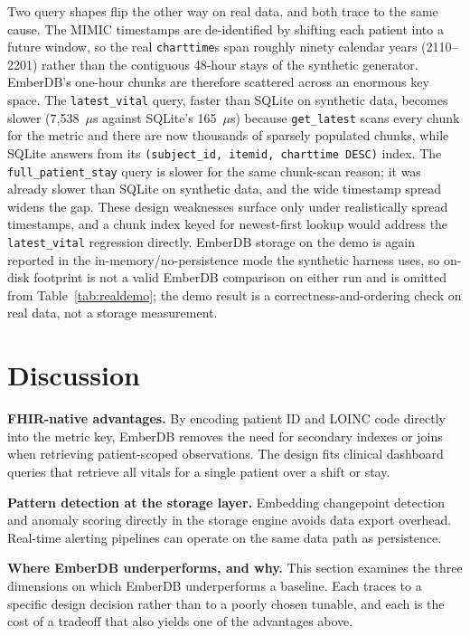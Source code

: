 \documentclass[journal]{IEEEtran}
\begin{document}
Two query shapes flip the other way on real data, and both trace to the same cause. The MIMIC timestamps are de-identified by shifting each patient into a future window, so the real \texttt{charttime}s span roughly ninety calendar years (2110--2201) rather than the contiguous 48-hour stays of the synthetic generator. EmberDB's one-hour chunks are therefore scattered across an enormous key space. The \texttt{latest\_vital} query, faster than SQLite on synthetic data, becomes slower (7{,}538~$\mu$s against SQLite's 165~$\mu$s) because \texttt{get\_latest} scans every chunk for the metric and there are now thousands of sparsely populated chunks, while SQLite answers from its \texttt{(subject\_id, itemid, charttime DESC)} index. The \texttt{full\_patient\_stay} query is slower for the same chunk-scan reason; it was already slower than SQLite on synthetic data, and the wide timestamp spread widens the gap. These design weaknesses surface only under realistically spread timestamps, and a chunk index keyed for newest-first lookup would address the \texttt{latest\_vital} regression directly. EmberDB storage on the demo is again reported in the in-memory/no-persistence mode the synthetic harness uses, so on-disk footprint is not a valid EmberDB comparison on either run and is omitted from Table~\ref{tab:realdemo}; the demo result is a correctness-and-ordering check on real data, not a storage measurement.

\section{Discussion}
\label{sec:discussion}

\textbf{FHIR-native advantages.}
By encoding patient ID and LOINC code directly into the metric key, EmberDB removes the need for secondary indexes or joins when retrieving patient-scoped observations.
The design fits clinical dashboard queries that retrieve all vitals for a single patient over a shift or stay.

\textbf{Pattern detection at the storage layer.}
Embedding changepoint detection and anomaly scoring directly in the storage engine avoids data export overhead. Real-time alerting pipelines can operate on the same data path as persistence.

\textbf{Where EmberDB underperforms, and why.}
This section examines the three dimensions on which EmberDB underperforms a baseline. Each traces to a specific design decision rather than to a poorly chosen tunable, and each is the cost of a tradeoff that also yields one of the advantages above.
\end{document}
